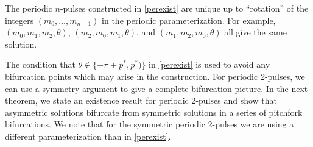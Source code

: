 \documentclass[thesis.tex]{subfiles}
\begin{document}
\begin{remark}\label{remark:cyclicperm}
The periodic $n$-pulses constructed in \cref{perexist} are unique up to ``rotation'' of the integers $(m_0, \dots, m_{n-1})$ in the periodic parameterization. For example, $(m_0, m_1, m_2, \theta)$, $(m_2, m_0, m_1, \theta)$, and $(m_1, m_2, m_0, \theta)$ all give the same solution.
\end{remark}

The condition that $\theta \notin \{-\pi + p^*, p^*) \}$ in \cref{perexist} is used to avoid any bifurcation points which may arise in the construction. For periodic 2-pulses, we can use a symmetry argument to give a complete bifurcation picture. In the next theorem, we state an existence result for periodic 2-pulses and show that asymmetric solutions bifurcate from symmetric solutions in a series of pitchfork bifurcations. We note that for the symmetric periodic 2-pulses we are using a different parameterization than in \cref{perexist}.
\end{document}
